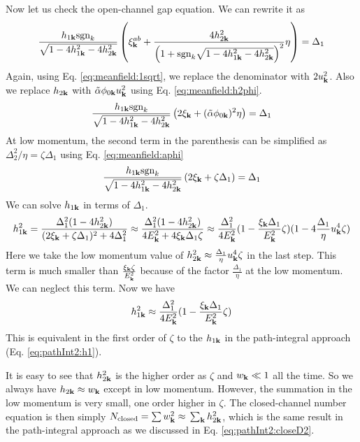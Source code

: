    Now let us check the open-channel gap equation.  We can rewrite it as 
   \begin{equation*}
   \frac{h_{1\mathbf{k}} \text{sgn}_{k}}{\sqrt{1-4 h_{1\mathbf{k}}^2-4 h_{2\mathbf{k}}^2}}\left( \xi^{ab}_{\mathbf{k}}+\frac{4 h_{2\mathbf{k}}^2}{\left(1+\text{sgn}_{k}\sqrt{1-4 h_{1\mathbf{k}}^2-4 h_{2\mathbf{k}}^2}\right)^2}\eta\right)=\Delta_{1}
   \end{equation*}
Again, using Eq. \ref{eq:meanfield:1sqrt}, we replace the denominator with $2u_{\mathbf{k}}^2$.  Also we replace $h_{2\mathbf{k}}$ with $\tilde\alpha{}\phi_{0\mathbf{k}}u_{\mathbf{k}}^{2}$ using Eq. \ref{eq:meanfield:h2phi}.  
 \begin{equation*}
   \frac{h_{1\mathbf{k}}\text{sgn}_{k}}{\sqrt{1-4 h_{1\mathbf{k}}^2-4 h_{2\mathbf{k}}^2}}\left( 2\xi_{\mathbf{k}}+({\tilde\alpha}\phi_{0\mathbf{k}})^2\eta\right)=\Delta_{1}
   \end{equation*}
 At low momentum, the second term in the parenthesis can be simplified as $\Delta_2^2/\eta=\zeta\Delta_{1}$  using Eq. \ref{eq:meanfield:aphi}
   \begin{equation*}
   \frac{h_{1\mathbf{k}}\text{sgn}_{k}}{\sqrt{1-4 h_{1\mathbf{k}}^2-4 h_{2\mathbf{k}}^2}}\left( 2\xi_{\mathbf{k}}+\zeta\Delta_{1}\right)=\Delta_{1}
   \end{equation*}
   We can solve $h_{1\mathbf{k}}$ in terms of $\Delta_1$.  
   \begin{equation*}
   h_{1\mathbf{k}}^2=\frac{\Delta_1^2(1-4h_{2\mathbf{k}}^2)}{(2\xi_{\mathbf{k}}+\zeta\Delta_{1})^2+4\Delta_1^2}
   \approx\frac{\Delta_1^2(1-4h_{2\mathbf{k}}^2)}{4E_{\mathbf{k}}^2+4\xi_{\mathbf{k}}\Delta_{1}\zeta}
   \approx\frac{\Delta_1^2}{4E_{\mathbf{k}}^2}(1-\frac{\xi_{\mathbf{k}}\Delta_{1}}{E_{\mathbf{k}}^2}\zeta)(1-4\frac{\Delta_{1}}{\eta}u_{\mathbf{k}}^4\zeta)
   \end{equation*}
   Here we take the low momentum value of $h_{2\mathbf{k}}^{2}\approx\frac{\Delta_{1}}{\eta}u_{\mathbf{k}}^4\zeta$ in the last step. This term is much smaller  than $\frac{\xi_{\mathbf{k}}\zeta}{E_{\mathbf{k}}^2}$ because of the factor $\frac{\Delta_{1}}{\eta}$ at the low momentum.  We can neglect this term. Now we have 
    \begin{equation}\label{eq:meanfield:h1approx}
   h_{1\mathbf{k}}^2\approx\frac{\Delta_1^2}{4E_{\mathbf{k}}^2}(1-\frac{\xi_{\mathbf{k}}\Delta_{1}}{E_{\mathbf{k}}^2}\zeta)
   \end{equation}
   This is equivalent in the first order of $\zeta$ to the $h_{1\mathbf{k}}$ in the path-integral approach (Eq. \ref{eq:pathInt2:h1}). 
   
   
It is easy to see that $h_{2\mathbf{k}}^2$ is the higher order as $\zeta$ and $w_{\mathbf{k}}\ll1$ all the time.  So we always have 
$h_{2\mathbf{k}}\approx{}w_{\mathbf{k}}$ except in low momentum.  However, the summation in the low momentum is very small, one order higher in $\zeta$.  The closed-channel number equation is then simply $N_{\text{closed}}=\sum{}w_{\mathbf{k}}^2\approx{}\sum_{\mathbf{k}}h_{2\mathbf{k}}^2$, which is the same result in the path-integral approach as we discussed in Eq. \ref{eq:pathInt2:closeD2}.

